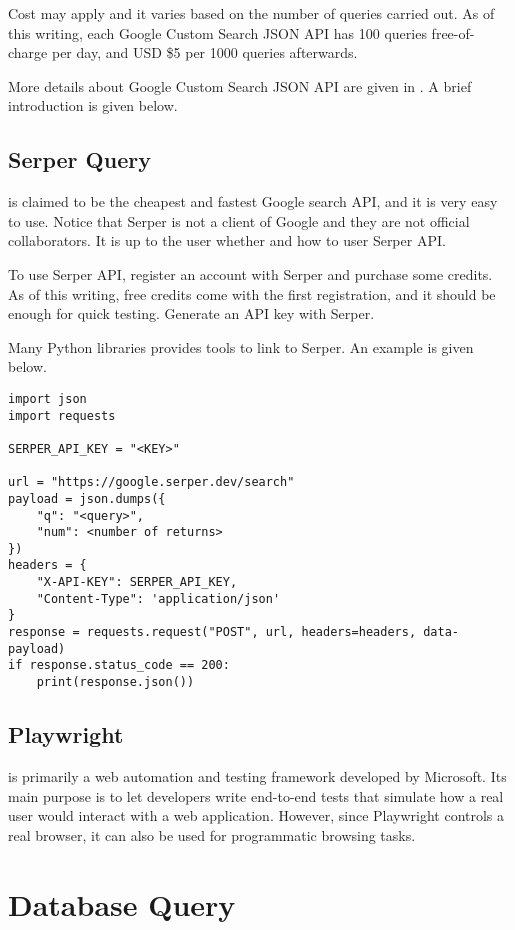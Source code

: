 Cost may apply and it varies based on the number of queries carried out. As of this writing, each Google Custom Search JSON API has 100 queries free-of-charge per day, and USD \$5 per 1000 queries afterwards.

More details about Google Custom Search JSON API are given in \cite{google2025customsearch}. A brief introduction is given below.

\subsection{Serper Query}

 is claimed to be the cheapest and fastest Google search API, and it is very easy to use. Notice that Serper is not a client of Google and they are not official collaborators. It is up to the user whether and how to user Serper API.

To use Serper API, register an account with Serper and purchase some credits. As of this writing, free credits come with the first registration, and it should be enough for quick testing. Generate an API key with Serper.

Many Python libraries provides tools to link to Serper. An example is given below.

\begin{lstlisting}
import json
import requests
	
SERPER_API_KEY = "<KEY>"

url = "https://google.serper.dev/search"
payload = json.dumps({
	"q": "<query>",
	"num": <number of returns>
})
headers = {
	"X-API-KEY": SERPER_API_KEY,
	"Content-Type": 'application/json'
}
response = requests.request("POST", url, headers=headers, data-payload)
if response.status_code == 200:
    print(response.json())
\end{lstlisting}

\subsection{Playwright}

 is primarily a web automation and testing framework developed by Microsoft. Its main purpose is to let developers write end-to-end tests that simulate how a real user would interact with a web application. However, since Playwright controls a real browser, it can also be used for programmatic browsing tasks.

\section{Database Query}

